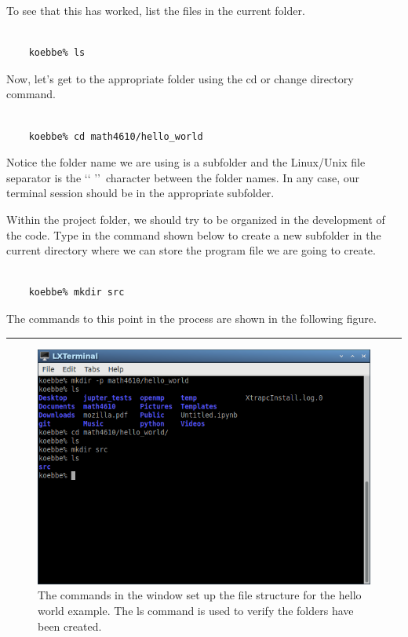 \documentclass[10pt,fleqn]{article}
\begin{document}
To see that this has worked, list the files in the current folder.
\begin{verbatim}

    koebbe% ls

\end{verbatim}
Now, let's get to the appropriate folder using the cd or change directory
command.
\begin{verbatim}

    koebbe% cd math4610/hello_world

\end{verbatim}
Notice the folder name we are using is a subfolder and the Linux/Unix file
separator is the \lq\lq \/ \rq\rq\ character between the folder names. In any
case, our terminal session should be in the appropriate subfolder.

Within the project folder, we should try to be organized in the development of
the code. Type in the command shown below to create a new subfolder in the
current directory where we can store the program file we are going to create.
\begin{verbatim}

    koebbe% mkdir src

\end{verbatim}
The commands to this point in the process are shown in the following figure.
\vskip0.1in\hrule\vskip0.1in
\vfill
\begin{figure}[h]
\centering
\includegraphics[width=5.0in]{../images/hello_world_01.png}
\caption{The commands in the window set up the file structure for the hello
         world example. The ls command is used to verify the folders have been
         created.}
\end{figure}
\end{document}
